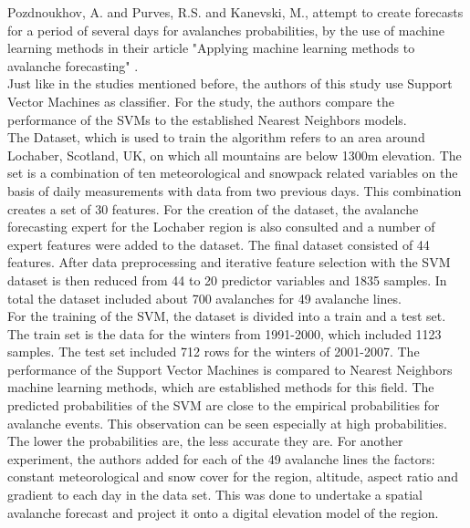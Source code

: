 \documentclass[../masterarbeit.tex]{subfiles}
\begin{document}
Pozdnoukhov, A. and Purves, R.S. and Kanevski, M., attempt to create forecasts for a period of several days for avalanches probabilities, by the use of machine learning methods in their article "Applying machine learning methods to avalanche forecasting" \textcite[]{Pozdnoukhov:2008}.  \\
Just like in the studies mentioned before, the authors of this study use Support Vector Machines as classifier. For the study, the authors compare the performance of the SVMs to the established Nearest Neighbors models. \autocite[]{Pozdnoukhov:2008} \\
The Dataset, which is used to train the algorithm refers to an area around Lochaber, Scotland, UK, on which all mountains are below 1300m elevation. The set is a combination of ten meteorological and snowpack related variables on the basis of daily measurements with data from two previous days. This combination creates a set of 30 features. For the creation of the dataset, the avalanche forecasting expert for the Lochaber region is also consulted and a number of expert features were added to the dataset. The final dataset consisted of 44 features. 
 After data preprocessing and iterative feature selection with the SVM dataset is then reduced from 44 to 20 predictor variables and 1835 samples. In total the dataset included about 700 avalanches for 49 avalanche lines. \autocite[]{Pozdnoukhov:2008} \\
 For the training of the SVM, the dataset is divided into a train and a test set. The train set is the data for the winters from 1991-2000, which included 1123 samples. The test set included 712 rows for the winters of 2001-2007. 
The performance of the Support Vector Machines is compared to Nearest Neighbors machine learning methods, which are established methods for this field. The predicted probabilities of the SVM are close to the empirical probabilities for avalanche events. This observation can be seen especially at high probabilities. The lower the probabilities are, the less accurate they are. For another experiment, the authors added for each of the 49 avalanche lines the factors: constant meteorological and snow cover for the region, altitude, aspect ratio and gradient to each day in the data set. This was done to undertake a spatial avalanche forecast and project it onto a digital elevation model of the region. \autocite[]{Pozdnoukhov:2008} \\
\end{document}
